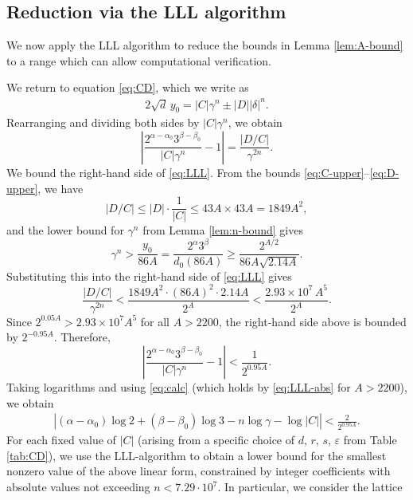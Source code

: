 \documentclass[11pt,a4paper]{article}
\numberwithin{equation}{section}
\numberwithin{table}{section}
\numberwithin{figure}{section}
\begin{document}
\subsection{Reduction via the LLL algorithm}

We now apply the LLL algorithm to reduce the bounds in
Lemma \ref{lem:A-bound} to a range which can allow computational verification.

\medskip

We return to equation \eqref{eq:CD}, which we write as
\begin{align*}
	2\sqrt{d}\,y_0 = |C|\gamma^n \pm |D||\delta|^n.
\end{align*}
Rearranging and dividing both sides by $|C|\gamma^n$, we obtain
\begin{equation}\label{eq:LLL}
	\left|\frac{2^{\alpha-\alpha_0}3^{\beta-\beta_0}}{|C|\gamma^n} - 1\right|
	= \frac{|D/C|}{\gamma^{2n}}.
\end{equation}
We bound the right-hand side of \eqref{eq:LLL}. From the
bounds \eqref{eq:C-upper}--\eqref{eq:D-upper}, we have
\begin{equation*}
	|D/C| \leq |D| \cdot \frac{1}{|C|} \leq 43A \times 43A =  1849A^2,
\end{equation*}
and the lower bound  for $\gamma^n$ from Lemma \ref{lem:n-bound} gives
\begin{equation*}
	\gamma^n > \frac{y_0}{86A} = \frac{2^\alpha 3^\beta}{d_0(86A)}
	\geq \frac{2^{A/2}}{86A\sqrt{2.14A}}.
\end{equation*}
Substituting this into the right-hand side of \eqref{eq:LLL} gives
\begin{equation*}
	\frac{|D/C|}{\gamma^{2n}}
	< \frac{1849A^2 \cdot (86A)^2 \cdot 2.14A}{2^A}
	< \frac{2.93\times 10^7\, A^5}{2^A}.
\end{equation*}
Since $2^{0.05A} > 2.93\times 10^7 A^5$ for all $A > 2200$, the right-hand side above is bounded by $2^{-0.95A}$. Therefore,
\begin{equation}\label{eq:LLL-abs}
	\left|\frac{2^{\alpha-\alpha_0}3^{\beta-\beta_0}}{|C|\gamma^n} - 1\right|
	< \frac{1}{2^{0.95A}}.
\end{equation}
Taking logarithms and using \eqref{eq:calc} (which holds by \eqref{eq:LLL-abs} for $A > 2200$), we obtain
\begin{align}\label{eq:LLL1}
	\left|(\alpha-\alpha_0)\log 2 + (\beta-\beta_0)\log 3
	- n\log\gamma - \log|C|\right|
	< \frac{2}{2^{0.95A}}.
\end{align}
For each fixed value of $|C|$ (arising from a specific choice of $d$, $r$, $s$, $\varepsilon$ from Table \ref{tab:CD}), we use the LLL-algorithm to obtain a lower bound for the smallest nonzero value of the above linear form, constrained by integer coefficients with absolute values not exceeding $n < 7.29 \cdot 10^{7}$. In particular, we consider the lattice  
\end{document}

